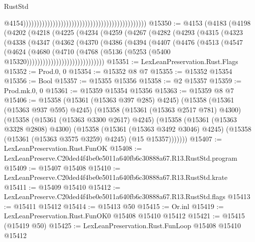 \begin{lexlean}{RustStd}
\begin{coremodule}
                                                                                                @4154))))))))))))))))))))))))))))))))))))))))))))))
@15350 := @4153
    (@4183
      (@4198
        (@4202
          (@4218
            (@4225
              (@4234
                (@4259
                  (@4267
                    (@4282
                      (@4293
                        (@4315
                          (@4323
                            (@4338
                              (@4347
                                (@4362
                                  (@4370
                                    (@4386
                                      (@4394
                                        (@4407
                                          (@4476
                                            (@4513
                                              (@4547
                                                (@4624
                                                  (@4680
                                                    (@4710
                                                      (@4768
                                                        (@5136
                                                          (@5253
                                                            (@5400
                                                              @15320)))))))))))))))))))))))))))))
@15351 := LexLeanPreservation.Rust.Flags
@15352 := Prod.{0, 0}
@15354 := @15352 @8 @7
@15355 := @15352 @15354
@15356 := Bool
@15357 := @15355 @15356
@15358 := @2 @15357
@15359 := Prod.mk.{0, 0}
@15361 := @15359 @15354 @15356
@15363 := @15359 @8 @7
@15406 := @15358
    (@15361 (@15363 @397 @285) @4245)
    (@15358
      (@15361 (@15363 @937 @595) @4245)
      (@15358
        (@15361 (@15363 @2517 @781) @4300)
        (@15358
          (@15361 (@15363 @3300 @2617) @4245)
          (@15358
            (@15361 (@15363 @3328 @2808) @4300)
            (@15358
              (@15361 (@15363 @3492 @3046) @4245)
              (@15358 (@15361 (@15363 @3575 @3259) @4245) (@15 @15357)))))))
@15407 := LexLeanPreservation.Rust.FunOK
@15408 := LexLeanPreserve.C20ded4f4be0e5011a640fb6c30888a67.R13.RustStd.program
@15409 := @15407 @15408
@15410 := LexLeanPreserve.C20ded4f4be0e5011a640fb6c30888a67.R13.RustStd.krate
@15411 := @15409 @15410
@15412 := LexLeanPreserve.C20ded4f4be0e5011a640fb6c30888a67.R13.RustStd.flags
@15413 := @15411 @15412
@15414 := @15413 @50
@15415 := Or.inl
@15419 := LexLeanPreservation.Rust.FunOK0 @15408 @15410 @15412
@15421 := @15415 (@15419 @50)
@15425 := LexLeanPreservation.Rust.FunLoop @15408 @15410 @15412

\end{coremodule}
\end{lexlean}
